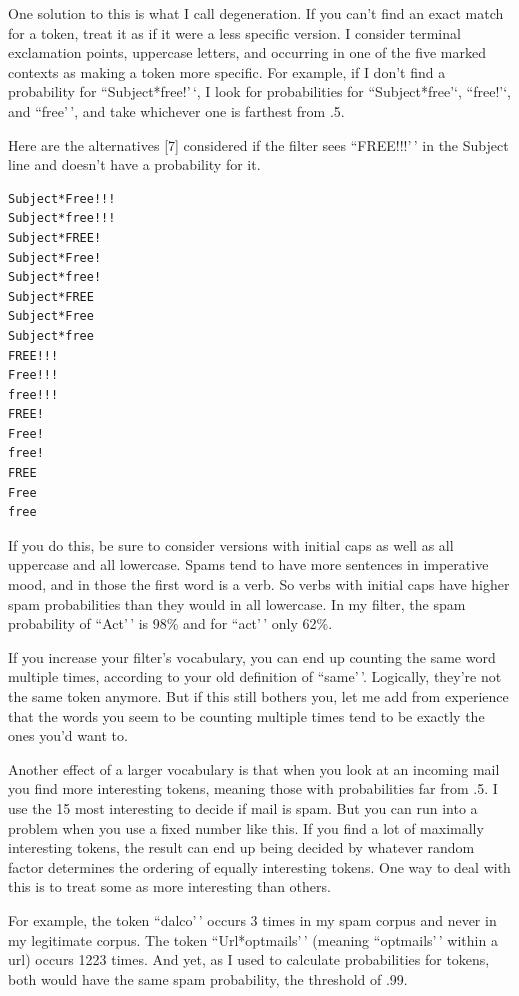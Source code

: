 One solution to this is what I call degeneration. If you can't find an
exact match for a token, treat it as if it were a less specific version.
I consider terminal exclamation points, uppercase letters, and occurring
in one of the five marked contexts as making a token more specific. For
example, if I don't find a probability for ``Subject*free!'\,`, I look
for probabilities for ``Subject*free'`, ``free!'`, and ``free'\,', and
take whichever one is farthest from .5.

Here are the alternatives {[}7{]} considered if the filter sees
``FREE!!!'\,' in the Subject line and doesn't have a probability for it.

\begin{verbatim}
Subject*Free!!!
Subject*free!!!
Subject*FREE!
Subject*Free!
Subject*free!
Subject*FREE
Subject*Free
Subject*free
FREE!!!
Free!!!
free!!!
FREE!
Free!
free!
FREE
Free
free              
\end{verbatim}

If you do this, be sure to consider versions with initial caps as well
as all uppercase and all lowercase. Spams tend to have more sentences in
imperative mood, and in those the first word is a verb. So verbs with
initial caps have higher spam probabilities than they would in all
lowercase. In my filter, the spam probability of ``Act'\,' is 98\% and
for ``act'\,' only 62\%.

If you increase your filter's vocabulary, you can end up counting the
same word multiple times, according to your old definition of
``same'\,'. Logically, they're not the same token anymore. But if this
still bothers you, let me add from experience that the words you seem to
be counting multiple times tend to be exactly the ones you'd want to.

Another effect of a larger vocabulary is that when you look at an
incoming mail you find more interesting tokens, meaning those with
probabilities far from .5. I use the 15 most interesting to decide if
mail is spam. But you can run into a problem when you use a fixed number
like this. If you find a lot of maximally interesting tokens, the result
can end up being decided by whatever random factor determines the
ordering of equally interesting tokens. One way to deal with this is to
treat some as more interesting than others.

For example, the token ``dalco'\,' occurs 3 times in my spam corpus and
never in my legitimate corpus. The token ``Url*optmails'\,' (meaning
``optmails'\,' within a url) occurs 1223 times. And yet, as I used to
calculate probabilities for tokens, both would have the same spam
probability, the threshold of .99.

